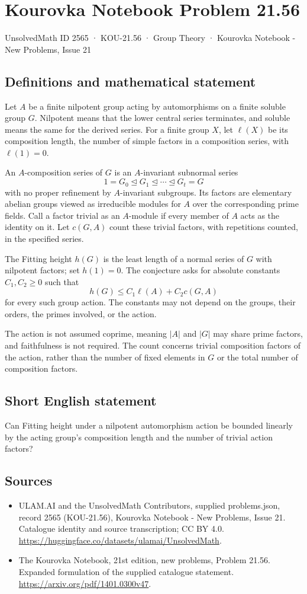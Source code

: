 \documentclass[11pt,a4paper]{article}
\begin{document}
\section*{Kourovka Notebook Problem 21.56}\label{2565}
{\small UnsolvedMath ID 2565 · KOU-21.56 · Group Theory · Kourovka Notebook - New Problems, Issue 21}
\subsection{Definitions and mathematical statement}
Let $A$ be a finite nilpotent group acting by automorphisms on a finite
soluble group $G$. Nilpotent means that the lower central series
terminates, and soluble means the same for the derived series.
For a finite group $X$, let $\ell(X)$ be its composition length, the
number of simple factors in a composition series, with $\ell(1)=0$.

An $A$-composition series of $G$ is an $A$-invariant subnormal series
\[
 1=G_0\trianglelefteq G_1\trianglelefteq\cdots
                          \trianglelefteq G_t=G
\]
with no proper refinement by $A$-invariant subgroups.
Its factors are elementary abelian groups viewed as irreducible modules
for $A$ over the corresponding prime fields. Call a factor trivial
as an $A$-module if every member of $A$ acts as the identity on it.
Let $c(G,A)$ count these trivial factors, with repetitions counted,
in the specified series.

The Fitting height $h(G)$ is the least length of a normal series of
$G$ with nilpotent factors; set $h(1)=0$.
The conjecture asks for absolute constants $C_1,C_2\ge0$ such that
\[
 h(G)\le C_1\ell(A)+C_2c(G,A)
\]
for every such group action. The constants may not depend on the groups,
their orders, the primes involved, or the action.

The action is not assumed coprime, meaning $|A|$ and $|G|$ may share
prime factors, and faithfulness is not required. The count concerns
trivial composition factors of the action, rather than the number of
fixed elements in $G$ or the total number of composition factors.
\subsection{Short English statement}
Can Fitting height under a nilpotent automorphism action be bounded linearly by the acting group’s composition length and the number of trivial action factors?
\subsection{Sources}
\begin{itemize}
\item[S1] ULAM.AI and the UnsolvedMath Contributors, supplied problems.json, record 2565 (KOU-21.56), Kourovka Notebook - New Problems, Issue 21. Catalogue identity and source transcription; CC BY 4.0.
\url{https://huggingface.co/datasets/ulamai/UnsolvedMath}.
\item[S2] The Kourovka Notebook, 21st edition, new problems, Problem 21.56. Expanded formulation of the supplied catalogue statement.
\url{https://arxiv.org/pdf/1401.0300v47}.
\end{itemize}
\end{document}
